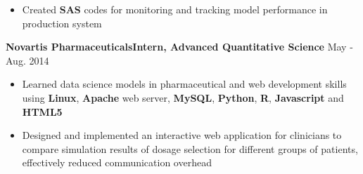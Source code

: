 \documentclass[10.5pt]{res} %
\begin{document}
\begin{resume}
\begin{itemize}
			\item Created \textbf{SAS} codes for monitoring and tracking model performance in production system
		\end{itemize}\vspace{-\topsep}
	\textbf{Novartis Pharmaceuticals}\quad\quad\quad \textbf{Intern, Advanced Quantitative Science}    \hfill May - Aug. 2014
		\begin{itemize} pt
			\item Learned data science models in pharmaceutical and web development skills using \textbf{Linux}, \textbf{Apache} web server, \textbf{MySQL}, \textbf{Python}, \textbf{R}, \textbf{Javascript} and \textbf{HTML5} %
			\item %
			Designed and implemented an interactive web application for clinicians to compare simulation results of dosage selection for different groups of patients, effectively reduced communication overhead  
		\end{itemize}\vspace{-\topsep}

\end{resume}
\end{document}
